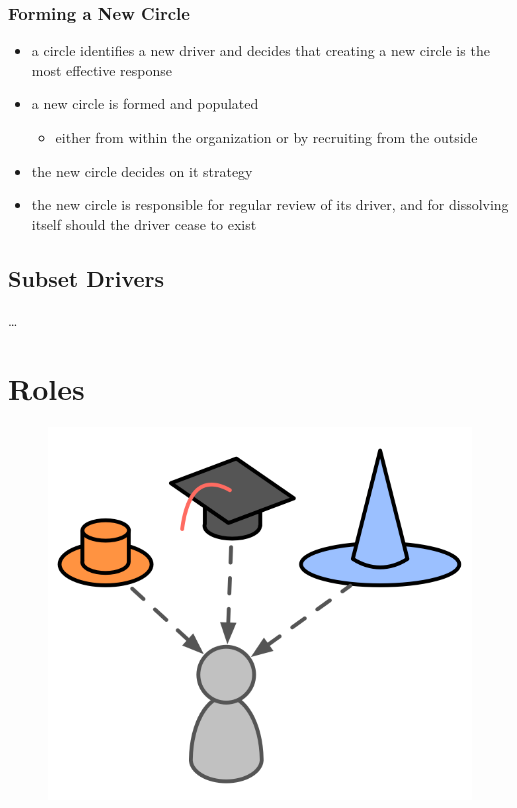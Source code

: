 \subsection{Forming a New Circle}
\label{forminganewcircle}

\begin{itemize}
\item a circle identifies a new driver and decides that creating a new circle is the most effective response

\item a new circle is formed and populated

\begin{itemize}
\item either from within the organization or by recruiting from the outside

\end{itemize}

\item the new circle decides on it strategy

\item the new circle is responsible for regular review of its driver, and for dissolving itself should the driver cease to exist

\end{itemize}

\section{Subset Drivers}
\label{subsetdrivers}

{\ldots}

\chapter{Roles}
\label{roles}

\begin{figure}[htbp]
\centering
\includegraphics[keepaspectratio,width=\textwidth,height=0.75\textheight]{img/people-and-roles/roles.png}
\end{figure}

